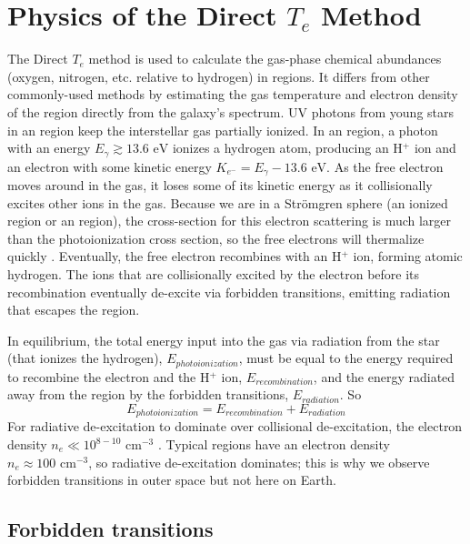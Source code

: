 \chapter[Direct Method Physics]{Physics of the Direct $T_e$ Method}\label{sec:physics}

The Direct $T_e$ method is used to calculate the gas-phase chemical abundances 
(oxygen, nitrogen, etc. relative to hydrogen) in  regions.  It differs 
from other commonly-used methods by estimating the gas temperature and electron 
density of the region directly from the galaxy's spectrum.  UV photons from 
young stars in an  region keep the interstellar gas partially ionized.  
In an  region, a photon with an energy 
$E_\gamma \gtrsim 13.6\text{ eV}$ ionizes a hydrogen atom, producing an H$^+$ 
ion and an electron with some kinetic energy 
$K_{e^-} = E_\gamma - 13.6\text{ eV}$.  As the free electron moves around in the 
gas, it loses some of its kinetic energy as it collisionally excites other ions 
in the gas.  Because we are in a Str\"{o}mgren sphere (an ionized region or an 
 region), the cross-section for this electron scattering is much 
larger than the photoionization cross section, so the free electrons will 
thermalize quickly \citep{DeRobertis87}.  Eventually, the free electron 
recombines with an H$^+$ ion, forming atomic hydrogen.  The ions that are 
collisionally excited by the electron before its recombination eventually 
de-excite via forbidden transitions, emitting radiation that escapes the 
 region.

In equilibrium, the total energy input into the gas via radiation from the star 
(that ionizes the hydrogen), $E_{photoionization}$, must be equal to the energy 
required to recombine the electron and the H$^+$ ion, $E_{recombination}$, and 
the energy radiated away from the  region by the forbidden 
transitions, $E_{radiation}$.  So
\begin{equation}
    E_{photoionization} = E_{recombination} + E_{radiation}
\end{equation}
For radiative de-excitation to dominate over collisional de-excitation, the 
electron density $n_e \ll 10^{8-10}\text{ cm}^{-3}$ \citep{DeRobertis87}.  
Typical  regions have an electron density 
$n_e \approx 100\text{ cm}^{-3}$, so radiative de-excitation dominates; this is 
why we observe forbidden transitions in outer space but not here on Earth.


\section{Forbidden transitions}

